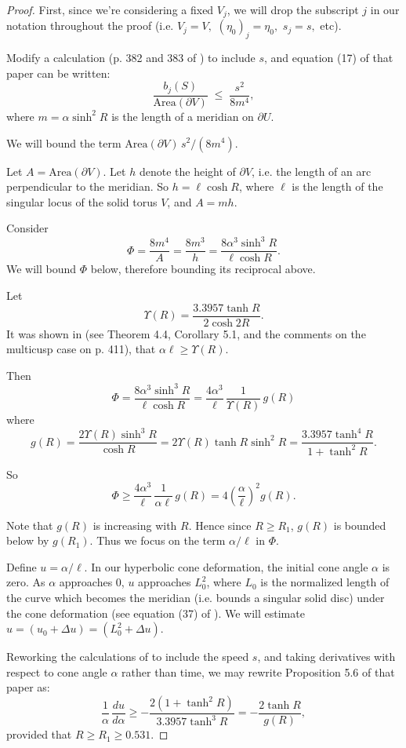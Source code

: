 \begin{proof}
  First, since we're considering a fixed $V_j$, we will drop the
  subscript $j$ in our notation throughout the proof (i.e. $V_j=V,$
  $(\eta_0)_j = \eta_0,$ $s_j=s,$ etc).
  
  Modify a calculation (p. 382 and 383 of \cite{hk:univ}) to include
  $s$, and equation (17) of that paper can be written:
$$\frac{b_j(S)}{\mbox{Area}(\partial V)}\; \leq \;\frac{s^2}{8m^4},$$
where
$m = \alpha\sinh^2 R$ is the length of a meridian on $\partial U$.

We will bound the term $\mbox{Area}(\partial V)\, s^2/(8m^4)$.

Let $A=\mbox{Area}(\partial V)$.  Let $h$ denote the height of
$\partial V$, i.e. the length of an arc perpendicular to the
meridian.  So $h=\ell\cosh R$, where $\ell$ is the length of the
singular locus of the solid torus $V$, and $A=mh$.

Consider
$$\Phi = \frac{8m^4}{A} = \frac{8m^3}{h} =
\frac{8\alpha^3\sinh^3R}{\ell\cosh R}.$$
We will bound $\Phi$ below, therefore bounding its reciprocal above.

Let
$$\Upsilon(R) = \frac{3.3957 \tanh R }{2\cosh 2R}.$$
It was shown in
\cite{hk:univ} (see Theorem 4.4, Corollary 5.1, and the comments on
the multicusp case on p. 411), that $\alpha\ell \geq \Upsilon(R)$.

Then
$$\Phi = \frac{8\alpha^3\sinh^3R}{\ell\cosh R} =
\frac{4\alpha^3}{\ell}\,\frac{1}{\Upsilon(R)}\,g(R)$$
where
$$g(R) = \frac{2\Upsilon(R)\sinh^3R}{\cosh R} = 2\Upsilon(R)\tanh R\sinh^2
R = \frac{3.3957 \tanh^4 R}{1+\tanh^2 R}.$$

So $$\Phi \geq \frac{4\alpha^3}{\ell}\,\frac{1}{\alpha\ell}\,g(R) =
4\left(\frac{\alpha}{\ell}\right)^2g(R).$$

Note that $g(R)$ is increasing with $R$.  Hence since $R\geq R_1$,
$g(R)$ is bounded below by $g(R_1)$.  Thus we focus on the term
$\alpha/\ell$ in $\Phi$.

Define $u=\alpha/\ell$.  In our hyperbolic cone deformation, the
initial cone angle $\alpha$ is zero.  As $\alpha$ approaches $0$, $u$
approaches $L_0^2$, where $L_0$ is the normalized length of the
curve which becomes the meridian (i.e. bounds a singular solid disc)
under the cone deformation (see equation (37) of \cite{hk:univ}).  We
will estimate $u=(u_0 + \Delta u) = (L_0^2+\Delta u)$.

Reworking the calculations of \cite{hk:univ} to include the speed $s$,
and taking derivatives with respect to cone angle $\alpha$ rather than
time, we may rewrite Proposition 5.6 of that paper as:
$$\frac{1}{\alpha}\,\frac{du}{d\alpha} \geq -\frac{2(1+\tanh^2 R)}
{3.3957\tanh^3R} = -\frac{2\tanh R}{g(R)},$$
provided that $R\geq
R_1\geq 0.531$.


\end{proof}
